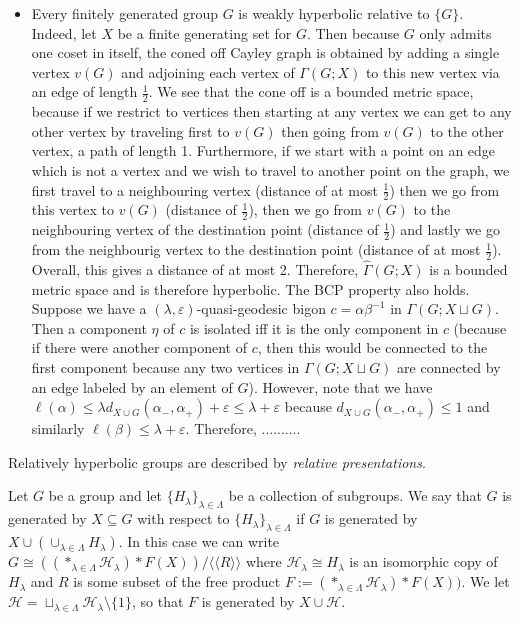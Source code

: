 \documentclass[12pt]{article}
\newcommand{\vs}{\vskip10pt}
\begin{document}
\begin{itemize}
		\item Every finitely generated group $G$ is weakly hyperbolic relative to $\{G\}$. Indeed, let $X$ be a finite generating set for $G$. Then because $G$ only admits one coset in itself, the coned off Cayley graph is obtained by adding a single vertex $v(G)$ and adjoining each vertex of $\Gamma(G; X)$ to this new vertex via an edge of length $\frac{1}{2}$. We see that the cone off is a bounded metric space, because if we restrict to vertices then starting at any vertex we can get to any other vertex by traveling first to $v(G)$ then going from $v(G)$ to the other vertex, a path of length 1. Furthermore, if we start with a point on an edge which is not a vertex and we wish to travel to another point on the graph, we first travel to a neighbouring vertex (distance of at most $\frac{1}{2}$) then we go from this vertex to $v(G)$ (distance of $\frac{1}{2}$), then we go from $v(G)$ to the neighbouring vertex of the destination point (distance of $\frac{1}{2}$) and lastly we go from the neighbourig vertex to the destination point (distance of at most $\frac{1}{2}$). Overall, this gives a distance of at most 2. Therefore, $\hat{\Gamma}(G; X)$ is a bounded metric space and is therefore hyperbolic. The BCP property also holds. Suppose we have a $(\lambda, \varepsilon)$-quasi-geodesic bigon $c = \alpha \beta^{-1}$ in $\Gamma(G; X \sqcup G)$. Then a component $\eta$ of $c$ is isolated iff it is the only component in $c$ (because if there were another component of $c$, then this would be connected to the first component because any two vertices in $\Gamma(G; X \sqcup G)$ are connected by an edge labeled by an element of $G$). However, note that we have $\ell(\alpha) \leq \lambda d_{X \cup G}(\alpha_{-}, \alpha_{+}) + \varepsilon \leq \lambda + \varepsilon $ because $d_{X \cup G}(\alpha_{-}, \alpha_{+}) \leq 1$ and similarly $\ell(\beta) \leq \lambda + \varepsilon$. Therefore, ..........
	\end{itemize}

	Relatively hyperbolic groups are described by \textit{relative presentations}. 
	
	\vs
	
	Let $G$ be a group and let $\{H_{\lambda}\}_{\lambda \in \Lambda}$ be a collection of subgroups. We say that $G$ is generated by $X \subseteq G$ with respect to $\{H_{\lambda}\}_{\lambda \in \Lambda}$ if $G$ is generated by $X \cup (\cup_{\lambda \in \Lambda} H_{\lambda})$. In this case we can write $G \cong ((*_{\lambda \in \Lambda} \mathcal{H}_{\lambda}) * F(X))/\langle \langle R \rangle \rangle$ where $\mathcal{H}_{\lambda} \cong H_{\lambda}$ is an isomorphic copy of $H_{\lambda}$ and $R$ is some subset of the free product $F := (*_{\lambda \in \Lambda} \mathcal{H}_{\lambda}) * F(X))$. We let $\mathcal{H} = \sqcup_{\lambda \in \Lambda} \mathcal{H}_{\lambda} \setminus \{1\}$, so that $F$ is generated by $X \cup \mathcal{H}$.
	
\end{document}
